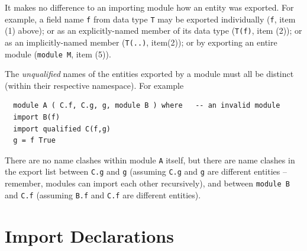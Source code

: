 It makes no difference to an importing module how an entity was 
exported.  For example, a field name \mbox{\tt f} from data type \mbox{\tt T} may be exported individually
(\mbox{\tt f}, item (1) above); or as an explicitly-named member of its data type (\mbox{\tt T(f)}, item (2));
or as an implicitly-named member (\mbox{\tt T(..)}, item(2)); or by exporting an entire
module (\mbox{\tt module\ M}, item (5)).  

The {\em unqualified} names of the entities exported by a module must all be distinct
(within their respective namespace).  For example
\bprog
{\small\begin{verbatim}
  module A ( C.f, C.g, g, module B ) where   -- an invalid module
  import B(f)
  import qualified C(f,g)
  g = f True
\end{verbatim}}
\eprog
There are no name clashes within module \mbox{\tt A} itself, 
but there are name clashes in the export list between \mbox{\tt C.g} and \mbox{\tt g}
(assuming \mbox{\tt C.g} and \mbox{\tt g} are different entities -- remember, modules
can import each other recursively), and between \mbox{\tt module\ B} and \mbox{\tt C.f}
(assuming \mbox{\tt B.f} and \mbox{\tt C.f} are different entities).

\section{Import Declarations}
\label{import}


